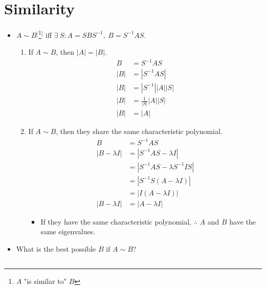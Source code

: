 \documentclass{article}
\begin{document}
\section*{Similarity}
\begin{itemize}
    \item {}$A\sim B$$^[$\footnote{$A$ "is similar to" $B$}$^]$ iff $\exists\ S:A=SBS^{-1},\ B=S^{-1}AS$.
    \begin{enumerate}
        \item If $A\sim B$, then $|A|=|B|$.
        \begin{align*}
            B &= S^{-1}AS\\
            |B| &= |S^{-1}AS|\\
            |B| &= |S^{-1}||A||S|\\
            |B| &= \frac{1}{|S|}|A||S|\\
            |B| &= |A|
        \end{align*}
        \item If $A\sim B$, then they share the same characteristic polynomial.
        \begin{align*}
            B &= S^{-1}AS\\
            |B-\lambda I| &= |S^{-1}AS-\lambda I|\\
            &= |S^{-1}AS-\lambda S^{-1}IS|\\
            &= |S^{-1}S(A-\lambda I)|\\
            &= |I(A-\lambda I)|\\
            |B-\lambda I| &= |A-\lambda I|
        \end{align*}
        \begin{itemize}
            \item If they have the same characteristic polynomial, $\therefore$ $A$ and $B$ have the same eigenvalues.
        \end{itemize}
    \end{enumerate}
    \item What is the best possible $B$ if $A\sim B$?
    $$
\end{itemize}
\end{document}
